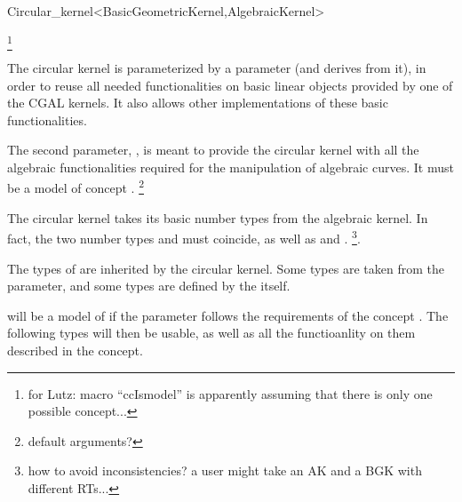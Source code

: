 \begin{ccRefClass}{Circular_kernel<BasicGeometricKernel,AlgebraicKernel>}

\ccDefinition


\ccIsModel

\footnote{for Lutz: macro ``ccIsmodel'' is
apparently assuming that there is only one possible concept...}

\ccParameters

The circular kernel is parameterized by a  parameter
(and derives from it), in order to reuse all needed functionalities on
basic linear objects provided by one of the CGAL kernels. It also
allows other implementations of these basic functionalities.

The second parameter, , is meant to provide the
circular kernel with all the algebraic functionalities required for the
manipulation of algebraic curves. 
It must be a model of concept . 
\footnote{default arguments?}

\ccInheritsFrom


\ccTypes

\ccThreeToTwo

The circular kernel takes its basic number types from the algebraic kernel. 
In fact, the two number types  and
 must coincide, as well as
 and .
\footnote{how to avoid inconsistencies? a user might take an AK and a
BGK with different RTs...}. 

The types of  are inherited by the circular kernel.
Some types are taken from the  parameter, and
some types are defined by the  itself.

 will be a model of  if the 
 parameter follows the requirements of the 
concept . The following types will then be
usable, as well as all the functioanlity on them described in the
 concept. 


\end{ccRefClass}
